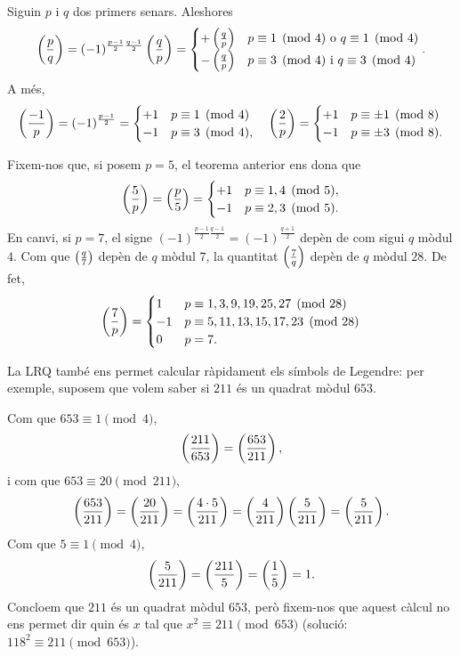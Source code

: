 \begin{theorem}
\label{thm:lrq}
Siguin $p$ i $q$ dos primers senars. Aleshores
\[
    \left(\frac{p}{q}\right) = (-1)^{\frac{p-1}{2}\frac{q-1}{2}}\left(\frac{q}{p}\right)=\begin{cases}
    +\left(\frac{q}{p}\right) & p\equiv 1\pmod 4\text{ o } q\equiv 1 \pmod{4}\\
    -\left(\frac{q}{p}\right) & p\equiv 3\pmod 4\text{ i } q\equiv 3 \pmod{4}
    \end{cases}.
    \]
A més,
\[
\left(\frac{-1}{p}\right) = (-1)^{\frac{p-1}{2}}=\begin{cases}
+1&p\equiv 1\pmod{4}\\
-1&p\equiv 3\pmod{4},
\end{cases}
\quad
\left(\frac{2}{p}\right) = \begin{cases}
+1 & p\equiv \pm 1\pmod {8}\\
-1 & p \equiv \pm 3 \pmod{8}.
\end{cases}
\]
\end{theorem}

Fixem-nos que, si posem $p=5$, el teorema anterior ens dona que
\[
\left(\frac{5}{p}\right) = \left(\frac{p}{5}\right) = \begin{cases}
+1 &p\equiv 1,4\pmod 5,\\
-1 &p\equiv 2,3\pmod 5.
\end{cases}
\]
En canvi, si $p=7$, el signe $(-1)^{\frac{p-1}{2}\frac{q-1}{2}}= (-1)^{\frac{q+1}{2}}$ depèn de com sigui $q$ mòdul $4$. Com que $\left(\frac{q}{7}\right)$ depèn de $q$ mòdul $7$, la quantitat $\left(\frac{7}{q}\right)$ depèn de $q$ mòdul $28$. De fet,
\[
\left(\frac{7}{p}\right)=\begin{cases}
1&p\equiv 1, 3, 9, 19, 25, 27\pmod{28}\\
-1&p\equiv 5, 11, 13, 15, 17, 23\pmod{28}\\
0 & p = 7.
\end{cases}
\]

La LRQ també ens permet calcular ràpidament els símbols de Legendre: per exemple, suposem que volem saber si $211$ és un quadrat mòdul $653$.

Com que $653\equiv 1\pmod 4$,
\[
\left(\frac{211}{653}\right)=\left(\frac{653}{211}\right),
\]
i com que $653\equiv 20\pmod{211}$,
\[
\left(\frac{653}{211}\right) = \left(\frac{20}{211}\right)=\left(\frac{4\cdot 5}{211}\right) = \left(\frac{4}{211}\right)\left(\frac{5}{211}\right)=\left(\frac{5}{211}\right).
\]
Com que $5\equiv 1\pmod 4$,
\[
\left(\frac{5}{211}\right)=\left(\frac{211}{5}\right)=\left(\frac{1}{5}\right) = 1.
\]
Concloem que $211$ és un quadrat mòdul $653$, però fixem-nos que aquest càlcul no ens permet dir quin és $x$ tal que $x^2\equiv 211\pmod{653}$ (solució: $118^2\equiv 211\pmod{653}$).


